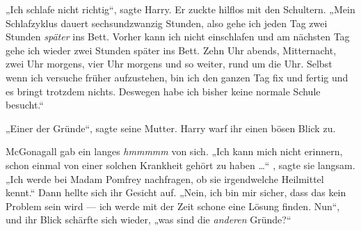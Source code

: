 „Ich schlafe nicht richtig“, sagte Harry. Er zuckte hilflos mit den Schultern.
„Mein Schlafzyklus dauert sechsundzwanzig Stunden, also gehe ich jeden Tag zwei Stunden \emph{später} ins Bett. Vorher kann ich nicht einschlafen und am nächsten Tag gehe ich wieder zwei Stunden später ins Bett. Zehn Uhr abends, Mitternacht, zwei Uhr morgens, vier Uhr morgens und so weiter, rund um die Uhr. Selbst wenn ich versuche früher aufzustehen, bin ich den ganzen Tag fix und fertig und es bringt trotzdem nichts. Deswegen habe ich bisher keine normale Schule besucht.“

„Einer der Gründe“, sagte seine Mutter. Harry warf ihr einen bösen Blick zu.

McGonagall gab ein langes \emph{hmmmmm} von sich.
„Ich kann mich nicht erinnern, schon einmal von einer solchen Krankheit gehört zu haben …“ , sagte sie langsam.
„Ich werde bei Madam Pomfrey nachfragen, ob sie irgendwelche Heilmittel kennt.“ Dann hellte sich ihr Gesicht auf.
„Nein, ich bin mir sicher, dass das kein Problem sein wird — ich werde mit der Zeit schone eine Lösung finden. Nun“, und ihr Blick schärfte sich wieder, „was sind die \emph{anderen} Gründe?“

